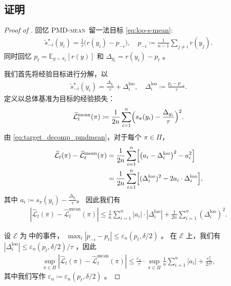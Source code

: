 \documentclass{article}
\theoremstyle{plain}
\theoremstyle{definition}
\theoremstyle{remark}
\newcommand{\E}{\mathbb{E}}
\newcommand{\abs}[1]{\left|#1\right|}
\begin{document}
\subsection{证明 }
\label{sec:proof_erm_pmdmean_constrained_refined}
\begin{proof}[Proof of ]
    回忆 \textsc{PMD-mean}\ 留一法目标 \eqref{eq:loo-s-mean}:
    \begin{align*}
        \widetilde{s}^\star_{-i}(y_i)=\frac{1}{\tau}\big(r(y_i)-p_{-i}\big),
        \quad
        p_{-i}\coloneqq \frac{1}{n-1}\sum_{j\neq i} r(y_j).
    \end{align*}
    同时回忆 $p_t=\E_{y\sim\pi_t}[r(y)]$  和 $\Delta_{y_i}=r(y_i)-p_t$ 。


    我们首先将经验目标进行分解，以 
    \begin{align}\label{eq:target_decomp_pmdmean}
        \widetilde{s}^\star_{-i}(y_i)
        =\frac{\Delta_{y_i}}{\tau} +\Delta^{\mathrm{loo}}_i,
        \quad
        \Delta^{\mathrm{loo}}_i \coloneqq \frac{p_t-p_{-i}}{\tau}.
    \end{align}
    定义以总体基准为目标的经验损失：
    \begin{align}\label{eq:ghost_emp_loss_mean}
        \widehat{\mathcal{L}}^{\mathrm{mean}}_t(\pi) \coloneqq\frac{1}{2n}\sum_{i=1}^n\Bigl(s_\pi(y_i)-\frac{\Delta_{y_i}}{\tau}\Bigr)^2.
    \end{align}
    由 \eqref{eq:target_decomp_pmdmean}，对于每个 $\pi\in\Pi$，
    \begin{align*}
        \widehat{\mathcal{L}}_t(\pi)-\widehat{\mathcal{L}}^{\mathrm{mean}}_t(\pi)
        &=\frac{1}{2n}\sum_{i=1}^n\Bigl[\bigl(a_i-\Delta^{\mathrm{loo}}_i\bigr)^2-a_i^2\Bigr]\\
        &=\frac{1}{2n}\sum_{i=1}^n\Bigl[(\Delta^{\mathrm{loo}}_i)^2-2a_i\cdot\Delta^{\mathrm{loo}}_i\Bigr],
    \end{align*}
    其中 $a_i\coloneqq s_\pi(y_i)-\frac{\Delta_{y_i}}{\tau}$。  
因此我们有 
    \begin{align}
    \label{eq:loo_perturb_identity}
        \abs{\widehat{\mathcal{L}}_t(\pi)-\widehat{\mathcal{L}}^{\mathrm{mean}}_t(\pi)}
        \leq
        \frac{1}{n}\sum_{i=1}^n \abs{a_i}\cdot \abs{\Delta^{\mathrm{loo}}_i}
        +\frac{1}{2n}\sum_{i=1}^n(\Delta^{\mathrm{loo}}_i)^2.
    \end{align}

    设 $\mathcal{E}$ 为  中的事件，
    $\max_i \abs{p_{-i}-p_t}\leq \varepsilon_n(p_t,\delta/2)$ 。
    在 $\mathcal{E}$ 上，我们有 $\abs{\Delta^{\mathrm{loo}}_i}\leq \varepsilon_n(p_t,\delta/2)/\tau$ ，因此
    \begin{align}\label{eq:loo_perturb_on_E}
        \sup_{\pi\in\Pi}
        \abs{\widehat{\mathcal{L}}_t(\pi)-\widehat{\mathcal{L}}^{\mathrm{mean}}_t(\pi)}
        \leq
        \frac{\varepsilon_n}{\tau}\cdot
        \sup_{\pi\in\Pi}\frac{1}{n}\sum_{i=1}^n \abs{a_i}
        +\frac{\varepsilon_n^2}{2\tau^2},
    \end{align}
    其中我们写作 $\varepsilon_n\coloneqq \varepsilon_n(p_t,\delta/2)$ 。


\end{proof}
\end{document}
